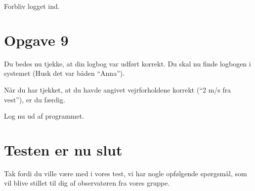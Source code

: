 Forbliv logget ind.

\section{Opgave 9}

Du bedes nu tjekke, at din logbog var udført korrekt.
Du skal nu finde logbogen i systemet (Husk det var båden ``Anna'').

Når du har tjekket, at du havde angivet vejrforholdene korrekt (``2 m/s fra vest''), er du færdig.

Log nu ud af programmet.

\section{Testen er nu slut}

Tak fordi du ville være med i vores test, vi har nogle opfølgende spørgsmål, som vil blive stillet til dig af observatøren fra vores gruppe.

